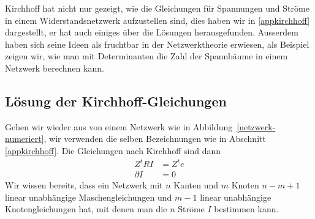 %
%
Kirchhoff hat nicht nur gezeigt, wie die Gleichungen für Spannungen
und Ströme in einem Widerstandsnetzwerk aufzustellen sind, dies
haben wir in \ref{appkirchhoff} dargestellt, er hat
auch einiges über die Lösungen herausgefunden.
Ausserdem haben sich seine Ideen als fruchtbar in der Netzwerktheorie
erwiesen, als Beispiel zeigen wir, wie man mit Determinanten die
Zahl der Spannbäume in einem Netzwerk berechnen kann.

\subsection{Lösung der Kirchhoff-Gleichungen}
Gehen wir wieder aus von einem Netzwerk wie in
Abbildung~\ref{netzwerk-numeriert}, wir verwenden die selben 
Bezeichnungen wie in Abschnitt \ref{appkirchhoff}.
Die Gleichungen nach Kirchhoff sind dann
\begin{align*}
Z^tRI&=Z^te \tag{Maschengleichungen}\\
\partial I&=0 \tag{Knotengleichungen}
\end{align*}
Wir wissen bereits, dass ein Netzwerk mit $n$ Kanten und $m$
Knoten $n-m+1$ linear unabhängige Maschengleichungen und
$m-1$ linear unabhängige Knotengleichungen hat, mit denen man
die $n$ Ströme $I$ bestimmen kann.

